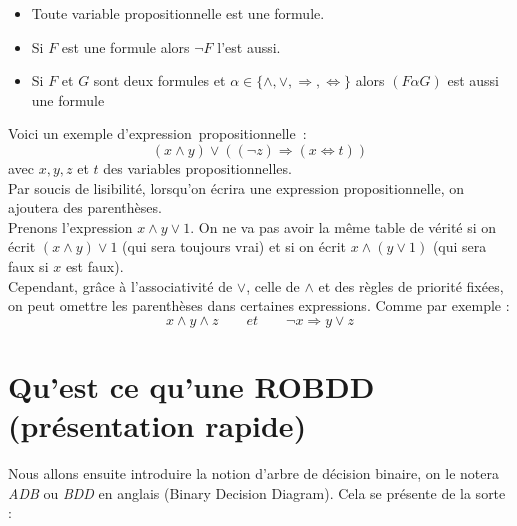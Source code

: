 \documentclass[a4paper, oneside]{report}
\newcommand{\expp}{expression~propositionnelle~}
\begin{document}
\begin{itemize}
\item Toute variable propositionnelle est une formule.
\item Si $F$ est une formule alors $\neg F$ l'est aussi.
\item Si $F$ et $G$ sont deux formules et $\alpha \in \{\wedge, \vee, \Rightarrow, \Leftrightarrow\}$ alors $(F \alpha G)$ est aussi une formule
\end{itemize}
Voici un exemple d'\expp :
$$(x \wedge y) \vee ((\neg z) \Rightarrow (x \Leftrightarrow t))$$
avec $x,y,z$ et $t$ des variables propositionnelles.\\

Par soucis de lisibilité, lorsqu'on écrira une expression propositionnelle, on ajoutera des parenthèses.\\
Prenons l'expression $x\wedge y\vee 1$. On ne va pas avoir la même table de vérité si on écrit $(x\wedge y)\vee 1$ (qui sera toujours vrai) et si on écrit $x \wedge (y \vee 1)$ (qui sera faux si $x$ est faux).\\
Cependant, grâce à l'associativité de $\vee$, celle de $\wedge$ et des règles de priorité fixées, on peut omettre les parenthèses dans certaines expressions. Comme par exemple :
$$x \wedge y \wedge z \hspace{2em} et \hspace{2em} \neg x \Rightarrow y \vee z$$

\section*{Qu'est ce qu'une ROBDD (présentation rapide)}

\noindent Nous allons ensuite introduire la notion d'arbre de décision binaire, on le notera \textit{ADB} ou \textit{BDD} en anglais (Binary Decision Diagram). Cela se présente de la sorte :
\end{document}
